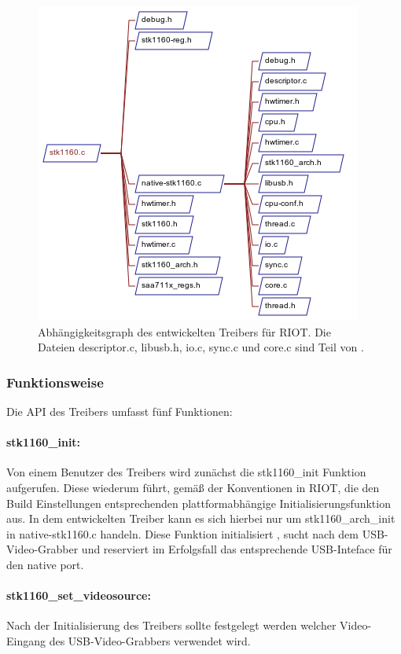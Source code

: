 \begin{figure}[htbp]
 \centering
 \includegraphics{./DependsOnGraph-stk1160-c.png}
 \caption{Abhängigkeitsgraph des entwickelten Treibers für RIOT. Die Dateien descriptor.c, libusb.h, io.c, sync.c und core.c sind Teil von \libusb{}.}
 \label{fig:dependsgraph}
\end{figure}

\subsubsection{Funktionsweise}
Die API des Treibers umfasst fünf Funktionen:

\paragraph{stk1160\_init:}
Von einem Benutzer des Treibers wird zunächst die stk1160\_init Funktion aufgerufen. Diese wiederum führt, gemäß der Konventionen in RIOT, die den Build Einstellungen entsprechenden plattformabhängige Initialisierungsfunktion aus. In dem entwickelten Treiber kann es sich hierbei nur um stk1160\_arch\_init in native-stk1160.c handeln.
Diese Funktion initialisiert \libusb{}, sucht nach dem USB-Video-Grabber und reserviert im Erfolgsfall das entsprechende USB-Inteface für den native port.

\paragraph{stk1160\_set\_videosource:} 
Nach der Initialisierung des Treibers sollte festgelegt werden welcher Video-Eingang des USB-Video-Grabbers verwendet wird. 

